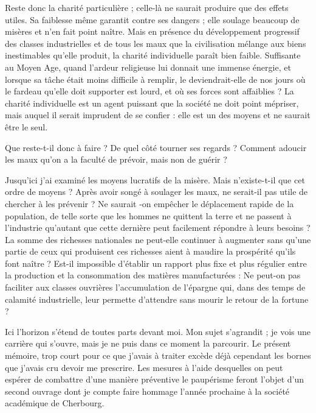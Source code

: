 \documentclass[french,twoside]{book} %
\newcommand\chapterclose{} %
\renewcommand\chapterclose{} %
\begin{document}
Reste donc la charité particulière ; celle-là ne saurait produire que des effets utiles. Sa faiblesse même garantit contre ses dangers ; elle soulage beaucoup de misères et n’en fait point naître. Mais en présence du développement progressif des classes industrielles et de tous les maux que la civilisation mélange aux biens inestimables qu’elle produit, la charité individuelle paraît bien faible. Suffisante au Moyen Age, quand l’ardeur religieuse lui donnait une immense énergie, et lorsque sa tâche était moins difficile à remplir, le deviendrait-elle de nos jours où le fardeau qu’elle doit supporter est lourd, et où ses forces sont affaiblies ? La charité individuelle est un agent puissant que la société ne doit point mépriser, mais auquel il serait imprudent de se confier : elle est un des moyens et ne saurait être le seul.\par
Que reste-t-il donc à faire ? De quel côté tourner ses regards ? Comment adoucir les maux qu’on a la faculté de prévoir, mais non de guérir ?\par
Jusqu’ici j’ai examiné les moyens lucratifs de la misère. Mais n’existe-t-il que cet ordre de moyens ? Après avoir songé à soulager les maux, ne serait-il pas utile de chercher à les prévenir ? Ne saurait -on empêcher le déplacement rapide de la population, de telle sorte que les hommes ne quittent la terre et ne passent à l’industrie qu’autant que cette dernière peut facilement répondre à leurs besoins ? La somme des richesses nationales ne peut-elle continuer à augmenter sans qu’une partie de ceux qui produisent ces richesses aient à maudire la prospérité qu’ils font naître ? Est-il impossible d’établir un rapport plus fixe et plus régulier entre la production et la consommation des matières manufacturées : Ne peut-on pas faciliter aux classes ouvrières l’accumulation de l’épargne qui, dans des temps de calamité industrielle, leur permette d’attendre sans mourir le retour de la fortune ?\par
Ici l’horizon s’étend de toutes parts devant moi. Mon sujet s’agrandit ; je vois une carrière qui s’ouvre, mais je ne puis dans ce moment la parcourir. Le présent mémoire, trop court pour ce que j’avais à traiter excède déjà cependant les bornes que j’avais cru devoir me prescrire. Les mesures à l’aide desquelles on peut espérer de combattre d’une manière préventive le paupérisme feront l’objet d’un second ouvrage dont je compte faire hommage l’année prochaine à la société académique de Cherbourg.
\chapterclose
\end{document}

